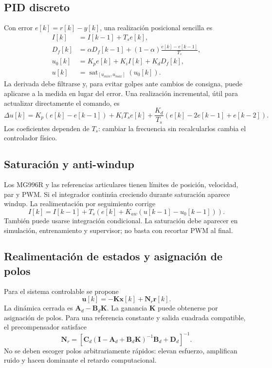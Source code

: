 \documentclass[11pt,letterpaper]{article}
\newcommand{\vect}[1]{\bm{#1}}
\newcommand{\mat}[1]{\bm{#1}}
\newcommand{\sat}{\operatorname{sat}}
\begin{document}
\subsection{PID discreto}
Con error $e[k]=r[k]-y[k]$, una realización posicional sencilla es
\begin{align}
 I[k]&=I[k-1]+T_s e[k],\\
 D_f[k]&=\alpha D_f[k-1]+(1-\alpha)\frac{e[k]-e[k-1]}{T_s},\\
 u_0[k]&=K_pe[k]+K_iI[k]+K_dD_f[k],\\
 u[k]&=\sat_{[u_{min},u_{max}]}(u_0[k]).
 \label{eq:pid}
\end{align}
La derivada debe filtrarse y, para evitar golpes ante cambios de consigna,
puede aplicarse a la medida en lugar del error. Una realización incremental,
útil para actualizar directamente el comando, es
\begin{equation}
 \Delta u[k]=K_p(e[k]-e[k-1])+K_iT_se[k]
 +\frac{K_d}{T_s}(e[k]-2e[k-1]+e[k-2]).
\end{equation}
Los coeficientes dependen de $T_s$: cambiar la frecuencia sin recalcularlos
cambia el controlador físico.

\subsection{Saturación y anti-windup}
Los MG996R y las referencias articulares tienen límites de posición, velocidad,
par y PWM. Si el integrador continúa creciendo durante saturación aparece
windup. La realimentación por seguimiento corrige
\begin{equation}
 I[k]=I[k-1]+T_s\left(e[k]+K_{aw}(u[k-1]-u_0[k-1])\right).
 \label{eq:antiwindup}
\end{equation}
También puede usarse integración condicional. La saturación debe aparecer en
simulación, entrenamiento y supervisor; no basta con recortar PWM al final.

\subsection{Realimentación de estados y asignación de polos}
Para el sistema controlable se propone
\begin{equation}
 \vect u[k]=-\mat K\vect x[k]+\mat N_r\vect r[k].
 \label{eq:statefeedback}
\end{equation}
La dinámica cerrada es $\mat A_d-\mat B_d\mat K$. La ganancia $\mat K$ puede
obtenerse por asignación de polos. Para una referencia constante y salida
cuadrada compatible, el precompensador satisface
\begin{equation}
 \mat N_r=\left[\mat C_d(\mat I-\mat A_d+\mat B_d\mat K)^{-1}\mat B_d
 +\mat D_d\right]^{-1}.
\end{equation}
No se deben escoger polos arbitrariamente rápidos: elevan esfuerzo, amplifican
ruido y hacen dominante el retardo computacional.
\end{document}
